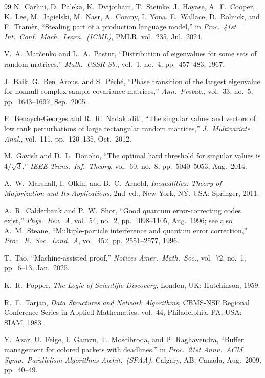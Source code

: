 \documentclass[10pt,twocolumn]{article}
\theoremstyle{spectralthm}
\begin{document}
\begin{thebibliography}{99}
N.~Carlini, D.~Paleka, K.~Dvijotham, T.~Steinke, J.~Hayase, A.~F.~Cooper, K.~Lee, M.~Jagielski, M.~Nasr, A.~Conmy, I.~Yona, E.~Wallace, D.~Rolnick, and F.~Tram\`{e}r, ``Stealing part of a production language model,'' in \textit{Proc.\ 41st Int.\ Conf.\ Mach.\ Learn.\ (ICML)}, PMLR, vol.~235, Jul.\ 2024.

V.~A.~Mar\v{c}enko and L.~A.~Pastur, ``Distribution of eigenvalues for some sets of random matrices,'' \textit{Math.\ USSR-Sb.}, vol.~1, no.~4, pp.~457--483, 1967.

J.~Baik, G.~Ben~Arous, and S.~P\'{e}ch\'{e}, ``Phase transition of the largest eigenvalue for nonnull complex sample covariance matrices,'' \textit{Ann.\ Probab.}, vol.~33, no.~5, pp.~1643--1697, Sep.\ 2005.

F.~Benaych-Georges and R.~R.~Nadakuditi, ``The singular values and vectors of low rank perturbations of large rectangular random matrices,'' \textit{J.\ Multivariate Anal.}, vol.~111, pp.~120--135, Oct.\ 2012.

M.~Gavish and D.~L.~Donoho, ``The optimal hard threshold for singular values is $4/\sqrt{3}$,'' \textit{IEEE Trans.\ Inf.\ Theory}, vol.~60, no.~8, pp.~5040--5053, Aug.\ 2014.

A.~W.~Marshall, I.~Olkin, and B.~C.~Arnold, \textit{Inequalities: Theory of Majorization and Its Applications}, 2nd~ed., New York, NY, USA: Springer, 2011.

A.~R.~Calderbank and P.~W.~Shor, ``Good quantum error-correcting codes exist,'' \textit{Phys.\ Rev.\ A}, vol.~54, no.~2, pp.~1098--1105, Aug.\ 1996; see also A.~M.~Steane, ``Multiple-particle interference and quantum error correction,'' \textit{Proc.\ R.\ Soc.\ Lond.\ A}, vol.~452, pp.~2551--2577, 1996.

T.~Tao, ``Machine-assisted proof,'' \textit{Notices Amer.\ Math.\ Soc.}, vol.~72, no.~1, pp.~6--13, Jan.\ 2025.

K.~R.~Popper, \textit{The Logic of Scientific Discovery}, London, UK: Hutchinson, 1959.

R.~E.~Tarjan, \textit{Data Structures and Network Algorithms}, CBMS-NSF Regional Conference Series in Applied Mathematics, vol.~44, Philadelphia, PA, USA: SIAM, 1983.

Y.~Azar, U.~Feige, I.~Gamzu, T.~Moscibroda, and P.~Raghavendra, ``Buffer management for colored packets with deadlines,'' in \textit{Proc.\ 21st Annu.\ ACM Symp.\ Parallelism Algorithms Archit.\ (SPAA)}, Calgary, AB, Canada, Aug.\ 2009, pp.~40--49.


\end{thebibliography}
\end{document}
